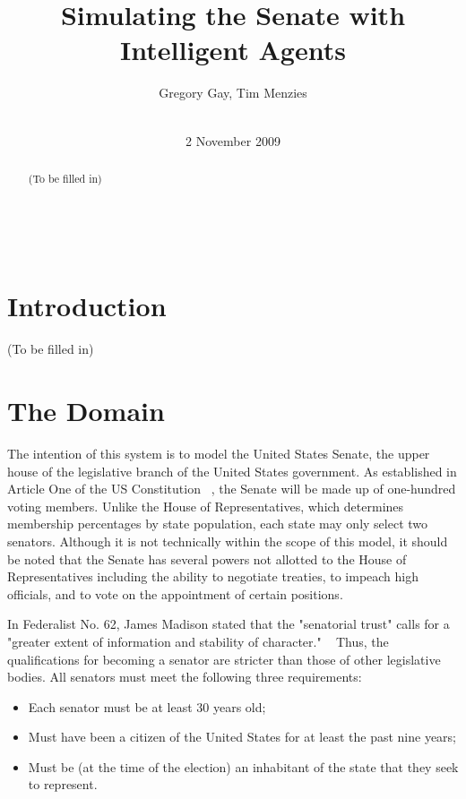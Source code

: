\documentclass{sig-alternate}
\newcounter{over}
\newenvironment{smallitem}
 {\setlength{\topsep}{0pt}
  \setlength{\partopsep}{0pt}
  \setlength{\parskip}{0pt}
  \begin{itemize}
   \setlength{\leftmargin}{.2in}
  \setlength{\parsep}{0pt}
  \setlength{\parskip}{0pt}
  \setlength{\itemsep}{0pt}}
 {\end{itemize}}
\newcommand{\bi}{\begin{smallitem}}
\newcommand{\ei}{\end{smallitem}}
\begin{document}
\conferenceinfo{~} {~} 




\title{Simulating the Senate with Intelligent Agents}

\author{
\alignauthor Gregory Gay, Tim Menzies
\\
       \\
}
%
\date{2 November 2009}

\maketitle
\begin{abstract}

(To be filled in)

\end{abstract}

\section{Introduction}

(To be filled in)

\section{The Domain}

The intention of this system is to model the United States Senate, the upper house of the legislative branch of the United States government. As established in Article One of the US Constitution ~\cite{const}, the Senate will be made up of one-hundred voting members. Unlike the House of Representatives, which determines membership percentages by state population, each state may only select two senators. Although it is not technically within the scope of this model, it should be noted that the Senate has several powers not allotted to the House of Representatives including the ability to negotiate treaties, to impeach high officials, and to vote on the appointment of certain positions.

In Federalist No. 62, James Madison stated that the "senatorial trust" calls for a "greater extent of information and stability of character." ~\cite{mad62} Thus, the qualifications for becoming a senator are stricter than those of other legislative bodies. All senators must meet the following three requirements: 
\bi
\item Each senator must be at least 30 years old;
\item Must have been a citizen of the United States for at least the past nine years;
\item Must be (at the time of the election) an inhabitant of the state that they seek to represent. 
\ei
\end{document}
